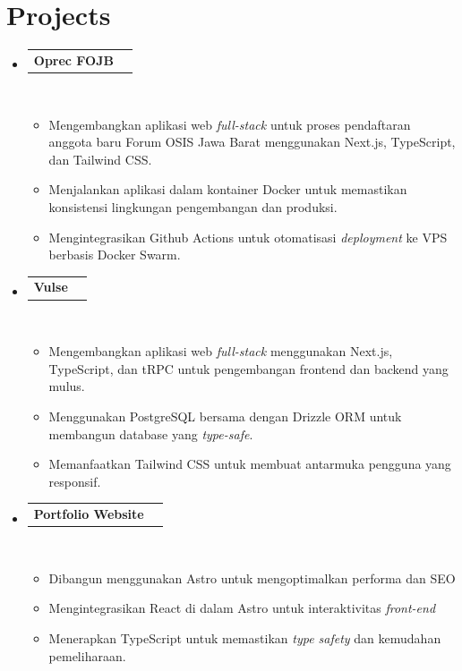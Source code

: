 \documentclass[letterpaper,11pt]{article}
\makeatletter
\newcommand{\resumeItem}[1]{
  \item\small{
    {#1 \vspace{-2pt}}
  }
}
\newcommand{\resumeProjectHeading}[2]{
    \item
    \begin{tabular*}{0.97\textwidth}{l@{\extracolsep{\fill}}r}
      \textbf{\normalsize #1} & #2 \\
    \end{tabular*}\vspace{-2pt}
}
\newcommand{\resumeSubHeadingListStart}{\begin{itemize}[leftmargin=0.15in, label={}]}
\newcommand{\resumeSubHeadingListEnd}{\end{itemize}}
\newcommand{\resumeItemListStart}{\begin{itemize}}
\newcommand{\resumeItemListEnd}{\end{itemize}\vspace{-5pt}}
\makeatother
\begin{document}


\section{Projects}
\resumeSubHeadingListStart
\resumeProjectHeading
{\textbf{Oprec FOJB} \hspace{0em} \href{https://oprec.forumosisjabar.id}{\footnotesize\faLink} \hspace{0em} \small\normalfont{\emph{(Next.js, React, Typescript, Tailwind CSS, Drizzle ORM, PostgreSQL, Docker)}}}
{} \\ [0.6em]
\resumeItemListStart
\resumeItem{Mengembangkan aplikasi web {\emph{full-stack}} untuk proses pendaftaran anggota baru Forum OSIS Jawa Barat menggunakan Next.js, TypeScript, dan Tailwind CSS.}
\resumeItem{Menjalankan aplikasi dalam kontainer Docker untuk memastikan konsistensi lingkungan pengembangan dan produksi.}
\resumeItem{Mengintegrasikan Github Actions untuk otomatisasi {\emph{deployment}} ke VPS berbasis Docker Swarm.}
\resumeItemListEnd
\resumeProjectHeading
{\textbf{Vulse} \hspace{0em} \href{https://github.com/dannrs/vulse}{\footnotesize\faGithub} \href{https://vulse.vercel.app/dannrs}{\footnotesize\faLink} \hspace{0em} \small\normalfont{\emph{(Next.js, React, Typescript, tRPC, Drizzle ORM, PostgreSQL, Tailwind CSS)}}}
{} \\ [0.6em]
\resumeItemListStart
\resumeItem{Mengembangkan aplikasi web {\emph{full-stack}} menggunakan Next.js, TypeScript, dan tRPC untuk pengembangan frontend dan backend yang
mulus.}
\resumeItem{Menggunakan PostgreSQL bersama dengan Drizzle ORM untuk membangun database yang {\emph{type-safe}}.}
\resumeItem{Memanfaatkan Tailwind CSS untuk membuat antarmuka pengguna yang responsif.}
\resumeItemListEnd
\resumeProjectHeading
{\textbf{Portfolio Website} \hspace{0em} \href{https://github.com/dannrs/danni.my.id}{\footnotesize\faGithub} \href{https://danni.my.id}{\footnotesize\faLink} \hspace{0em} \small\normalfont{\emph{(Astro, React, Typescript, Tailwind CSS)}}}
{} \\ [0.6em]
\resumeItemListStart
\resumeItem{Dibangun menggunakan Astro untuk mengoptimalkan performa dan SEO}
\resumeItem{Mengintegrasikan React di dalam Astro untuk interaktivitas {\emph{front-end}}}
\resumeItem{Menerapkan TypeScript untuk memastikan {\emph{type safety}} dan kemudahan pemeliharaan.}
\resumeItemListEnd
\resumeSubHeadingListEnd
\end{document}
